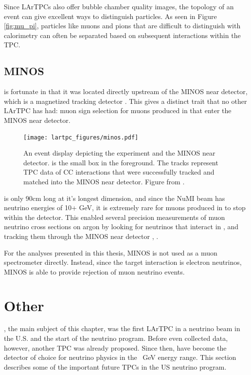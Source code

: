 Since LArTPCs also offer bubble chamber quality images, the topology of an event can give excellent ways to distinguish particles.  As seen in Figure \ref{fig:mu_pi}, particles like muons and pions that are difficult to distinguish with calorimetry can often be separated based on subsequent interactions within the TPC.



\subsection{MINOS}

\argoneut is fortunate in that it was located directly upstream of the MINOS near detector, which is a magnetized tracking detector \cite{MINOS}.  This gives \argoneut a distinct trait that no other LArTPC has had: muon sign selection for muons produced in \argoneut that enter the MINOS near detector.

\begin{figure}[htb]
  \centering
  \texttt{[image: lartpc\_figures/minos.pdf]}
  \caption[\argoneut and MINOS]{An event display depicting the \argoneut experiment and the MINOS near detector. \argoneut is the small box in the foreground.  The tracks represent TPC data of \numu CC interactions that were successfully tracked and matched into the MINOS near detector.  Figure from \cite{Anderson:2012vc}.}
  \label{fig:signal_shaping}
\end{figure}

\argoneut is only 90cm long at it's longest dimension, and since the NuMI beam has neutrino energies of 10+ GeV, it is extremely rare for muons produced in \argoneut to stop within the detector.  This enabled several precision measurements of muon neutrino cross sections on argon by looking for neutrinos that interact in \argoneut, and tracking them through the MINOS near detector \cite{Anderson:2011ce}, \cite{Acciarri:2014isz}.

For the analyses presented in this thesis, MINOS is not used as a muon spectrometer directly.  Instead, since the target interaction is electron neutrinos, MINOS is able to provide rejection of muon neutrino events.

\section{Other \lartpcs}

\argoneut, the main subject of this chapter, was the first LArTPC in a neutrino beam in the U.S. and the start of the \lartpc neutrino program.  Before \argoneut even collected data, however, another TPC was already proposed.  Since then, \lartpcs have become the detector of choice for neutrino physics in the ~GeV energy range.  This section describes some of the important future TPCs in the US neutrino program. 

